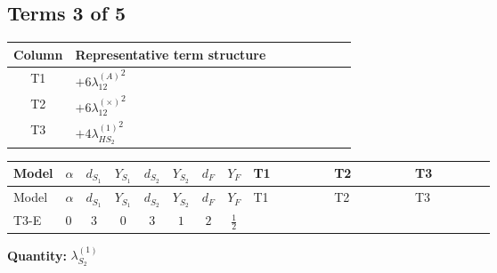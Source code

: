 \documentclass[8pt]{article}
\begin{document}
\begin{landscape}
\subsection*{Terms 3 of 5}
\begin{center}
\begin{tabular}{@{}c >{\raggedright\arraybackslash}p{0.82\linewidth}@{}}
\toprule
Column & Representative term structure \\
\midrule
T1 & \(\displaystyle +6 {\lambda_{12}^{(A)}}^2\) \\
\midrule
T2 & \(\displaystyle +6 {\lambda_{12}^{(\times)}}^2\) \\
\midrule
T3 & \(\displaystyle +4 {\lambda_{HS_2}^{(1)}}^2\) \\
\midrule
\bottomrule
\end{tabular}
\end{center}
\smallskip
\tiny
\begin{longtable}{@{}llcccccc >{\raggedright\arraybackslash}p{0.21\linewidth} >{\raggedright\arraybackslash}p{0.21\linewidth} >{\raggedright\arraybackslash}p{0.21\linewidth}@{}}
\toprule
Model & $\alpha$ & $d_{S_1}$ & $Y_{S_1}$ & $d_{S_2}$ & $Y_{S_2}$ & $d_F$ & $Y_F$ & T1 & T2 & T3 \\
\midrule
\endfirsthead
\toprule
Model & $\alpha$ & $d_{S_1}$ & $Y_{S_1}$ & $d_{S_2}$ & $Y_{S_2}$ & $d_F$ & $Y_F$ & T1 & T2 & T3 \\
\midrule
\endhead
T3-E & $0$ & $3$ & $0$ & $3$ & $1$ & $2$ & $\frac{1}{2}$ & \scriptsize\adjustbox{max width=\linewidth}{$\begin{gathered} +6 {\lambda_{12}^{(A)}}^2\end{gathered}$} & \scriptsize\adjustbox{max width=\linewidth}{$\begin{gathered} +6 {\lambda_{12}^{(\times)}}^2\end{gathered}$} & \scriptsize\adjustbox{max width=\linewidth}{$\begin{gathered} +4 {\lambda_{HS_2}^{(1)}}^2\end{gathered}$} \\
\midrule
\bottomrule
\end{longtable}
\clearpage
\noindent\textbf{Quantity: }$\lambda_{S_2}^{(1)}$\par\smallskip

\end{landscape}
\end{document}
